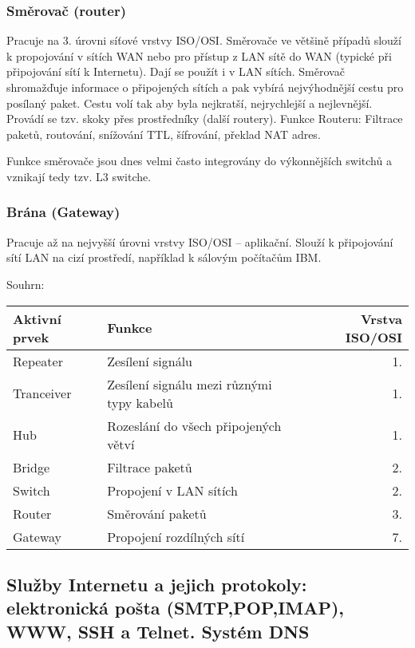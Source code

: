 \subsubsection{Směrovač (router)}
Pracuje na 3. úrovni síťové vrstvy ISO/OSI. Směrovače ve většině případů slouží k propojování v sítích WAN nebo pro přístup z LAN sítě do WAN (typické při připojování sítí k Internetu). Dají se použít i v LAN sítích. Směrovač shromažďuje informace o připojených sítích a pak vybírá nejvýhodnější cestu pro posílaný paket. Cestu volí tak aby byla nejkratší, nejrychlejší a nejlevnější. Provádí se tzv. skoky přes prostředníky (další routery). Funkce Routeru: Filtrace paketů, routování, snížování TTL, šífrování, překlad NAT adres.

Funkce směrovače jsou dnes velmi často integrovány do výkonnějších switchů a vznikají tedy tzv. L3 switche. 
\subsubsection{Brána (Gateway)}
Pracuje až na nejvyšší úrovni vrstvy ISO/OSI – aplikační. Slouží k připojování sítí LAN na cizí prostředí, například k sálovým počítačům IBM.

Souhrn:
\begin{table}[h!]
\centering
\begin{tabular}{l l r}
Aktivní prvek & Funkce & Vrstva ISO/OSI \\
\hline
Repeater & Zesílení signálu & 1.\\
Tranceiver & Zesílení signálu mezi různými typy kabelů & 1.\\
Hub & Rozeslání do všech připojených větví  & 1.\\
Bridge & Filtrace paketů & 2.\\
Switch & Propojení v LAN sítích & 2.\\
Router & Směrování paketů & 3.\\
Gateway & Propojení rozdílných sítí & 7. \\
\hline
\end{tabular}
\end{table}


\subsection[Služby internetu, DNS]{Služby Internetu a jejich protokoly: elektronická pošta (SMTP,POP,IMAP), WWW, SSH a Telnet. Systém DNS}
